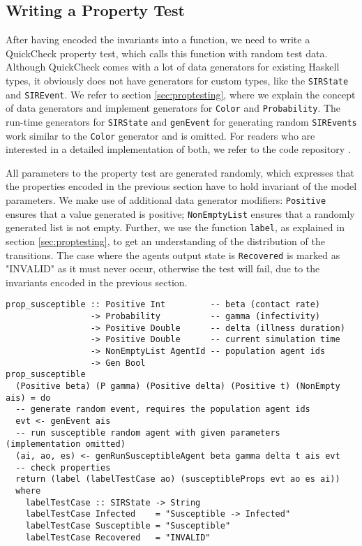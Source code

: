 \subsection{Writing a Property Test}
After having encoded the invariants into a function, we need to write a QuickCheck property test, which calls this function with random test data. Although QuickCheck comes with a lot of data generators for existing Haskell types, it obviously does not have generators for custom types, like the \texttt{SIRState} and \texttt{SIREvent}. We refer to section \ref{sec:proptesting}, where we explain the concept of data generators and implement generators for \texttt{Color} and \texttt{Probability}. The run-time generators for \texttt{SIRState} and \texttt{genEvent} for generating random \texttt{SIREvents} work similar to the \texttt{Color} generator and is omitted. For readers who are interested in a detailed implementation of both, we refer to the code repository \cite{thaler_repository_2019}.

All parameters to the property test are generated randomly, which expresses that the properties encoded in the previous section have to hold invariant of the model parameters. We make use of additional data generator modifiers: \texttt{Positive} ensures that a value generated is positive; \texttt{NonEmptyList} ensures that a randomly generated list is not empty. Further, we use the function \texttt{label}, as explained in section \ref{sec:proptesting}, to get an understanding of the distribution of the transitions. The case where the agents output state is \texttt{Recovered} is marked as "INVALID" as it must never occur, otherwise the test will fail, due to the invariants encoded in the previous section.

\begin{footnotesize}
\begin{verbatim}
prop_susceptible :: Positive Int         -- beta (contact rate)
                 -> Probability          -- gamma (infectivity)
                 -> Positive Double      -- delta (illness duration)
                 -> Positive Double      -- current simulation time
                 -> NonEmptyList AgentId -- population agent ids
                 -> Gen Bool
prop_susceptible 
  (Positive beta) (P gamma) (Positive delta) (Positive t) (NonEmpty ais) = do
  -- generate random event, requires the population agent ids
  evt <- genEvent ais
  -- run susceptible random agent with given parameters (implementation omitted)
  (ai, ao, es) <- genRunSusceptibleAgent beta gamma delta t ais evt
  -- check properties
  return (label (labelTestCase ao) (susceptibleProps evt ao es ai))
  where
    labelTestCase :: SIRState -> String
    labelTestCase Infected    = "Susceptible -> Infected"
    labelTestCase Susceptible = "Susceptible"
    labelTestCase Recovered   = "INVALID"
\end{verbatim}
\end{footnotesize}

